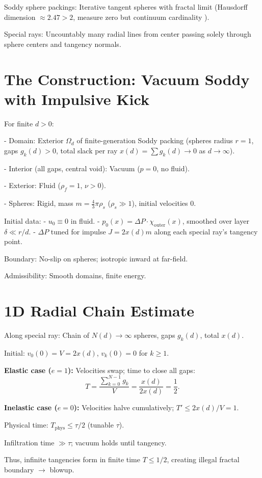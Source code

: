 \documentclass{article}
\begin{document}
Soddy sphere packings: Iterative tangent spheres with fractal limit (Hausdorff dimension $\approx 2.47 > 2$, measure zero but continuum cardinality \cite{boyd1973apollonian}).

Special rays: Uncountably many radial lines from center passing solely through sphere centers and tangency normals.

\section{The Construction: Vacuum Soddy with Impulsive Kick}
For finite $d > 0$:

- Domain: Exterior $\Omega_d$ of finite-generation Soddy packing (spheres radius $r=1$, gaps $g_k(d) > 0$, total slack per ray $x(d) = \sum g_k(d) \to 0$ as $d \to \infty$).

- Interior (all gaps, central void): Vacuum ($p=0$, no fluid).

- Exterior: Fluid ($\rho_f=1$, $\nu>0$).

- Spheres: Rigid, mass $m = \frac{4}{3}\pi \rho_s$ ($\rho_s \gg 1$), initial velocities $0$.

Initial data:
- $u_0 \equiv 0$ in fluid.
- $p_0(x) = \Delta P \cdot \chi_{\text{outer}}(x)$, smoothed over layer $\delta \ll r/d$.
- $\Delta P$ tuned for impulse $J = 2 x(d) m$ along each special ray's tangency point.

Boundary: No-slip on spheres; isotropic inward at far-field.

Admissibility: Smooth domains, finite energy.

\section{1D Radial Chain Estimate}
Along special ray: Chain of $N(d) \to \infty$ spheres, gaps $g_k(d)$, total $x(d)$.

Initial: $v_0(0) = V = 2 x(d)$, $v_k(0)=0$ for $k \geq 1$.

\textbf{Elastic case ($e=1$):}
Velocities swap; time to close all gaps:
\[
T = \frac{\sum_{k=0}^{N-1} g_k}{V} = \frac{x(d)}{2 x(d)} = \frac{1}{2}.
\]

\textbf{Inelastic case ($e=0$):}
Velocities halve cumulatively; $T' \leq 2 x(d)/V = 1$.

Physical time: $T_{\text{phys}} \leq \tau/2$ (tunable $\tau$).

Infiltration time $\gg \tau$; vacuum holds until tangency.

Thus, infinite tangencies form in finite time $T \leq 1/2$, creating illegal fractal boundary $\to$ blowup.
\end{document}
